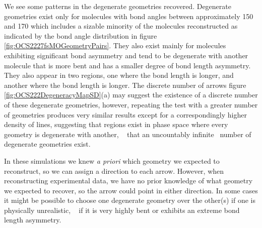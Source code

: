 We see some patterns in the degenerate geometries recovered. Degenerate geometries exist only for molecules with bond angles between approximately \SI{150}{\deg} and \SI{170}{\deg} which includes a sizable minority of the molecules reconstructed as indicated by the bond angle distribution in figure \ref{fig:OCS2227fsMOGeometryPairs}. They also exist mainly for molecules exhibiting significant bond asymmetry and tend to be degenerate with another molecule that is more bent and has a smaller degree of bond length asymmetry. They also appear in two regions, one where the  bond length is longer, and another where the  bond length is longer. The discrete number of arrows figure \ref{fig:OCS222DegeneracyMapSD}(a) may suggest the existence of a discrete number of these degenerate geometries, however, repeating the test with a greater number of geometries produces very similar results except for a correspondingly higher density of lines, suggesting that regions exist in phase space where every geometry is degenerate with another, \ie~ that an uncountably infinite\footnotemark~ number of degenerate geometries exist.


In these simulations we knew \textit{a priori} which geometry we expected to reconstruct, so we can assign a direction to each arrow. However, when reconstructing experimental data, we have no prior knowledge of what geometry we expected to recover, so the arrow could point in either direction. In some cases it might be possible to choose one degenerate geometry over the other(s) if one is physically unrealistic, \eg~ if it is very highly bent or exhibits an extreme bond length asymmetry.

